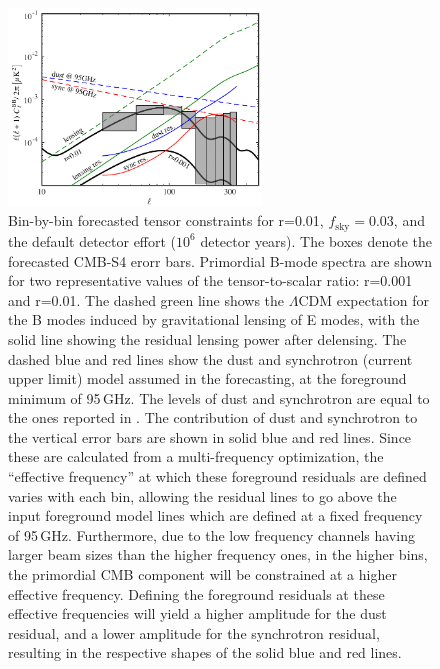 \begin{figure}[h]
\begin{center}
\includegraphics[width=0.6\textwidth]{Inflation/clBB_r01_decorr_v4.pdf}
\end{center}
\caption{
Bin-by-bin forecasted tensor constraints for r=0.01, $f_\mathrm{sky} = 0.03$, 
and the default detector effort ($10^{6}$ detector years).
The boxes denote the forecasted CMB-S4 erorr bars.  
Primordial B-mode spectra are shown for two representative values of 
the tensor-to-scalar ratio: r=0.001 and r=0.01. The dashed green line shows the
$\Lambda$CDM expectation for the B modes induced by gravitational lensing of E modes, 
with the solid line showing the residual lensing power after delensing. The
dashed blue and red lines show the dust and synchrotron (current upper limit) model 
assumed in the forecasting, at the foreground minimum of 95\,GHz. The levels of dust
and synchrotron are equal to the ones reported in \cite{Array:2015xqh}. The 
contribution of dust and synchrotron to the vertical error bars are shown in 
solid blue and red lines. Since these are calculated from a multi-frequency 
optimization, the ``effective frequency'' at which these foreground residuals are 
defined varies with each bin, allowing the residual lines to go above the input 
foreground model lines which are defined at a fixed frequency of 95\,GHz. 
Furthermore, due to the low frequency channels having larger 
beam sizes than the higher frequency ones, in the higher bins, the primordial CMB 
component will be constrained at a higher effective frequency. Defining the 
foreground residuals at these effective frequencies will yield a higher amplitude
for the dust residual, and a lower amplitude for the synchrotron residual, resulting
in the respective shapes of the solid blue and red lines.}
\label{fig_clBBr01}
\end{figure}

